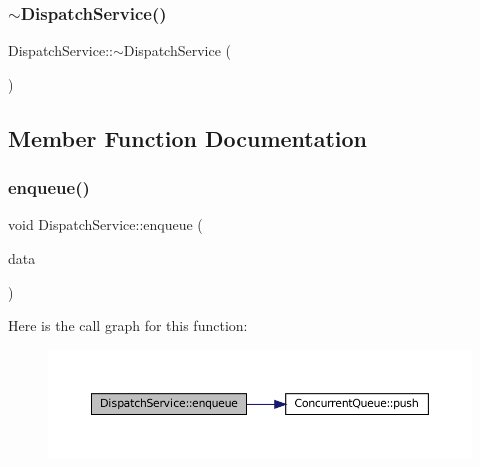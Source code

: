 \subsubsection{\texorpdfstring{$\sim$\+Dispatch\+Service()}{~DispatchService()}}
{\footnotesize\ttfamily Dispatch\+Service\+::$\sim$\+Dispatch\+Service (\begin{DoxyParamCaption}{ }\end{DoxyParamCaption})\hspace{0.3cm}{\ttfamily [inline]}}



\subsection{Member Function Documentation}
\mbox{\label{classDispatchService_a0180e712e67d8062499f25a49747c1f8}} 
\subsubsection{\texorpdfstring{enqueue()}{enqueue()}}
{\footnotesize\ttfamily void Dispatch\+Service\+::enqueue (\begin{DoxyParamCaption}\item[{\mbox{\hyperlink{structDispatchData}{Dispatch\+Data}} \&}]{data }\end{DoxyParamCaption})\hspace{0.3cm}{\ttfamily [inline]}}

Here is the call graph for this function\+:
\nopagebreak
\begin{figure}[H]
\begin{center}
\leavevmode
\includegraphics[width=350pt]{classDispatchService_a0180e712e67d8062499f25a49747c1f8_cgraph}
\end{center}
\end{figure}
\mbox{\label{classDispatchService_aa7b4c44dbb842aa208e4109da6c68465}} 

